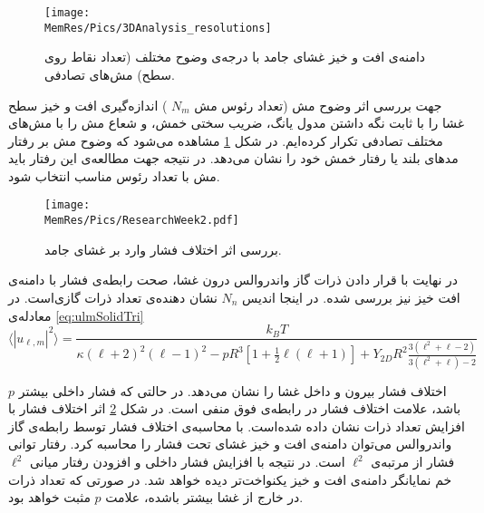 \begin{figure}[htbp]
\begin{center}
\texttt{[image: \\MemRes/Pics/3DAnalysis\_resolutions]}
\caption{
دامنه‌ی افت و خیز غشای جامد با درجه‌ی وضوح مختلف (تعداد نقاط روی  سطح) مش‌های تصادفی. 
}
\label{fig:3DAnalysis_resolutions}
\end{center}
\end{figure}

جهت بررسی اثر وضوح مش (تعداد رئوس مش 
$N_m$
) اندازه‌گیری افت و خیز سطح غشا را با ثابت نگه داشتن مدول یانگ، ضریب سختی خمش، و شعاع مش را با مش‌های مختلف تصادفی تکرار کرده‌ایم. در شکل
\ref{fig:3DAnalysis_resolutions}
مشاهده می‌شود که وضوح مش بر رفتار مد‌های بلند یا رفتار خمش خود را نشان می‌دهد. در نتیجه جهت مطالعه‌ی این رفتار باید مش با تعداد رئوس مناسب انتخاب شود. 

\begin{figure}[htbp]
\begin{center}
\texttt{[image: \\MemRes/Pics/ResearchWeek2.pdf]}
\caption{
بررسی اثر اختلاف فشار وارد بر غشای جامد.
}
\label{fig:presure}
\end{center}
\end{figure}

در نهایت با قرار دادن ذرات گاز واندروالس درون غشا، صحت رابطه‌ی فشار با دامنه‌ی افت خیز نیز بررسی شده. در اینجا اندیس 
$N_n$
نشان دهنده‌ی تعداد ذرات گازی‌است. در معادله‌ی 
\ref{eq:ulmSolidTri}
\begin{equation}
\langle|u_{\ell,m}|^2\rangle=\frac{k_BT}{\kappa(\ell+2)^2(\ell-1)^2-pR^3\left[1+\frac{1}{2}\ell(\ell+1)\right]+Y_{2D}R^2\frac{3(\ell^2+\ell-2)}{3(\ell^2+\ell)-2}}
\end{equation}

$p$
اختلاف فشار بیرون و داخل غشا را نشان می‌دهد. در حالتی که فشار داخلی بیشتر باشد، علامت اختلاف فشار در رابطه‌ی فوق منفی‌ است. در شکل 
\ref{fig:presure}
اثر اختلاف فشار با افزایش تعداد ذرات نشان دا‌ده‌ شده‌است. با محاسبه‌ی اختلاف فشار توسط رابطه‌ی گاز واندروالس می‌توان دامنه‌ی افت و خیز غشای تحت فشار را محاسبه کرد. رفتار توانی فشار از مرتبه‌ی 
$\ell^2$
است. در نتیجه با افزایش فشار داخلی و افزودن رفتار میانی
$\ell^2$
خم نمایانگر دامنه‌ی افت و خیز یکنواخت‌تر دیده خواهد شد. در صورتی که تعداد ذرات در خارج از غشا بیشتر باشده، علامت 
$p$
مثبت خواهد بود.






